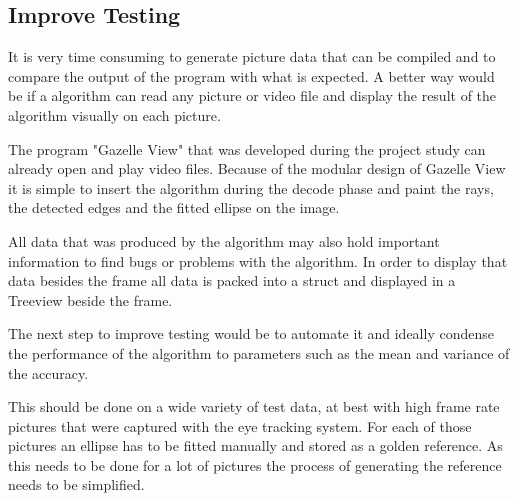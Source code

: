 \subsection{Improve Testing}
It is very time consuming to generate picture data that can be compiled and to compare the output of the program with what is expected. A better way would be if a algorithm can read any picture or video file and display the result of the algorithm visually on each picture. 

The program "Gazelle View" that was developed during the project study can already open and play video files. Because of the modular design of Gazelle View it is simple to insert the algorithm during the decode phase and paint the rays, the detected edges and the fitted ellipse on the image.

All data that was produced by the algorithm may also hold important information to find bugs or problems with the algorithm. In order to display that data besides the frame all data is packed into a struct and displayed in a Treeview beside the frame. 

The next step to improve testing would be to automate it and ideally condense the performance of the algorithm to parameters such as the mean and variance of the accuracy.

This should be done on a wide variety of test data, at best with high frame rate pictures that were captured with the eye tracking system. For each of those pictures an ellipse has to be fitted manually and stored as a golden reference. As this needs to be done for a lot of pictures the process of generating the reference needs to be simplified.
